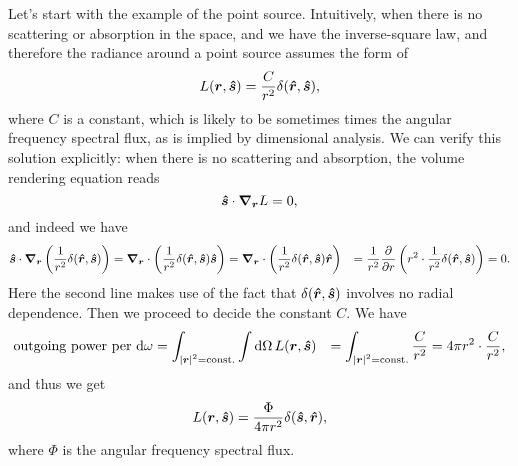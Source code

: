 \documentclass[hyperref, a4paper]{article}
\newcommand*{\const}{\mathrm{const}}
\def\\{}%
\begin{document}
Let's start with the example of the point source.
Intuitively, when there is no scattering or absorption in the space,
and we have the inverse-square law,
and therefore the radiance around a point source assumes the form of 
\begin{equation}
    L(\vb*{r}, \vu*{s}) = \frac{C}{r^2} \delta(\vu*{r}, \vu*{s}),
\end{equation} 
where $C$ is a constant, which is likely to be 
sometimes times the angular frequency spectral flux,
as is implied by dimensional analysis.
We can verify this solution explicitly: 
when there is no scattering and absorption, 
the volume rendering equation reads 
\begin{equation}
    \vu*{s} \cdot \grad_{\vb*{r}} L = 0,
    \label{eq:trivial-bulk-re}
\end{equation}
and indeed we have  
\begin{equation}
    \begin{aligned}
        \vu*{s} \cdot \grad_{\vb*{r}} \left(\frac{1}{r^2} \delta(\vu*{r}, \vu*{s})\right) &= 
        \grad_{\vb*{r}} \cdot \left(
            \frac{1}{r^2} \delta(\vu*{r}, \vu*{s}) \vu*{s}
        \right) 
        = \grad_{\vb*{r}} \cdot \left(
            \frac{1}{r^2} \delta(\vu*{r}, \vu*{s}) \vu*{r}
        \right) \\
        &= \frac{1}{r^2} \pdv{r} \left(
            r^2 \cdot \frac{1}{r^2} \delta(\vu*{r}, \vu*{s})
        \right) = 0.
    \end{aligned}
\end{equation}
Here the second line makes use of the fact 
that $\delta(\vu*{r}, \vu*{s})$ involves no radial dependence.
Then we proceed to decide the constant $C$.
We have 
\begin{equation}
    \begin{aligned}
        \text{outgoing power per $\dd{\omega}$} &=
        \int_{\abs*{\vb*{r}}^2 = \const.} \int \dd{\Omega} L(\vb*{r}, \vu*{s}) \\
        &= \int_{\abs*{\vb*{r}}^2 = \const.} \frac{C}{r^2} = 4 \pi r^2 \cdot \frac{C}{r^2},
    \end{aligned}
    \label{eq:flux-around-point-source}
\end{equation}
and thus we get 
\begin{equation}
    L(\vb*{r}, \vu*{s}) = \frac{\Phi}{4 \pi r^2} \delta(\vu*{s}, \vu*{r}),
    \label{eq:ideal-inverse-square}
\end{equation}
where $\Phi$ is the angular frequency spectral flux. 
\end{document}
